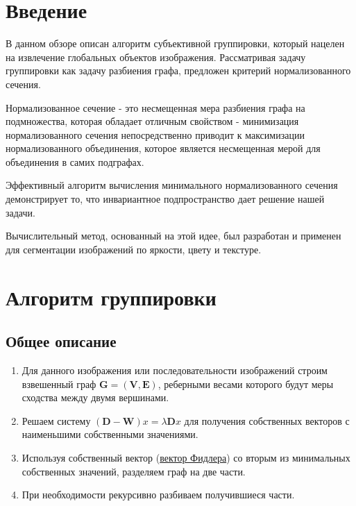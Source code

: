 \documentclass[a4paper,10pt]{article}
\theoremstyle{plain}
\theoremstyle{definition}
\theoremstyle{remark}
\begin{document}
\section{Введение}

В данном обзоре описан алгоритм субъективной группировки, который нацелен на извлечение глобальных объектов изображения. Рассматривая задачу группировки как задачу разбиения графа, предложен критерий нормализованного сечения.

Нормализованное сечение - это несмещенная мера разбиения графа на подмножества, которая обладает отличным свойством - минимизация нормализованного сечения непосредственно приводит к максимизации нормализованного объединения, которое является несмещенная мерой для объединения в самих подграфах.

Эффективный алгоритм вычисления минимального нормализованного сечения демонстрирует то, что инвариантное подпространство дает решение нашей задачи.

Вычислительный метод, основанный на этой идее, был разработан и применен для сегментации изображений по яркости, цвету и текстуре.

\section{Алгоритм группировки}

\subsection{Общее описание}

\begin{enumerate}
\item Для данного изображения или последовательности изображений строим взвешенный граф $\mathbf { G } = ( \mathbf { V } , \mathbf { E } )$, реберными весами которого будут меры сходства между двумя вершинами.
\item Решаем систему $( \mathbf { D } - \mathbf { W } ) x = \lambda \mathbf { D } x$ для получения собственных векторов с наименьшими собственными значениями.
\item Используя собственный вектор (\href{https://ru.wikipedia.org/wiki/%D0%90%D0%BB%D0%B3%D0%B5%D0%B1%D1%80%D0%B0%D0%B8%D1%87%D0%B5%D1%81%D0%BA%D0%B0%D1%8F_%D1%81%D0%B2%D1%8F%D0%B7%D0%BD%D0%BE%D1%81%D1%82%D1%8C#%D0%92%D0%B5%D0%BA%D1%82%D0%BE%D1%80_%D0%A4%D0%B8%D0%B4%D0%BB%D0%B5%D1%80%D0%B0}{вектор Фидлера}) со вторым из минимальных собственных значений, разделяем граф на две части.
\item При необходимости рекурсивно разбиваем получившиеся части.
\end{enumerate}
\end{document}
